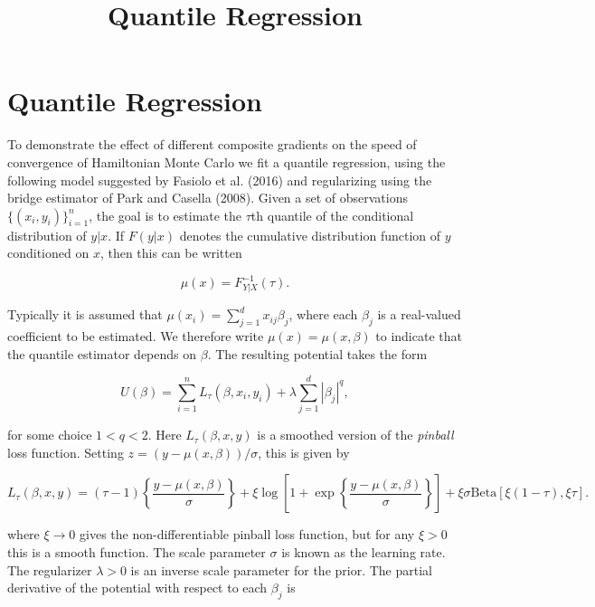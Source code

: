 \documentclass[11pt]{article}
\title{Quantile Regression}
\begin{document}
    
    
    \maketitle
    
    

    
    \section{Quantile Regression}\label{quantile-regression}

    To demonstrate the effect of different composite gradients on the speed
of convergence of Hamiltonian Monte Carlo we fit a quantile regression,
using the following model suggested by Fasiolo et al. (2016) and
regularizing using the bridge estimator of Park and Casella (2008).
Given a set of observations \(\{(x_i,y_i)\}_{i=1}^n\), the goal is to
estimate the \(\tau\)th quantile of the conditional distribution of
\(y|x\). If \(F(y|x)\) denotes the cumulative distribution function of
\(y\) conditioned on \(x\), then this can be written

\begin{equation}
\mu(x) = F_{Y|X}^{-1}(\tau).
\end{equation}

Typically it is assumed that \(\mu(x_i)=\sum_{j=1}^d x_{ij}\beta_j\),
where each \(\beta_j\) is a real-valued coefficient to be estimated. We
therefore write \(\mu(x)=\mu(x,\beta)\) to indicate that the quantile
estimator depends on \(\beta\). The resulting potential takes the form

\begin{equation}
U(\beta) = \sum_{i=1}^n L_\tau(\beta,x_i,y_i) + \lambda \sum_{j=1}^d |\beta_j|^q,
\end{equation}

for some choice \(1 < q < 2\). Here \(L_\tau(\beta,x,y)\) is a smoothed
version of the \emph{pinball} loss function. Setting
\(z = (y-\mu(x,\beta))/\sigma\), this is given by

\begin{equation}
L_\tau(\beta,x,y) = (\tau-1)\left\{ \frac{y-\mu(x,\beta)}{\sigma} \right\} 
+ \xi \log \left[ 1+ \exp\left\{ \frac{y-\mu(x,\beta)}{\sigma} \right\} \right]
+ \xi \sigma \text{Beta}[\xi(1-\tau),\xi\tau].
\end{equation}

where \(\xi \to 0\) gives the non-differentiable pinball loss function,
but for any \(\xi>0\) this is a smooth function. The scale parameter
\(\sigma\) is known as the learning rate. The regularizer \(\lambda>0\)
is an inverse scale parameter for the prior. The partial derivative of
the potential with respect to each \(\beta_j\) is
\end{document}
